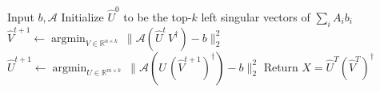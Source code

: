\documentclass[11pt]{article}
\theoremstyle{plain}
\theoremstyle{definition}
\newcommand{\R}{\mathbb{R}}
\DeclareMathOperator*{\argmin}{argmin}
\newcommand{\aff}{{\mathcal A}}
\newcommand{\as}{AltMinSense\ }
\begin{document}
\begin{algorithm}[th]
\caption{{\bf \as:} Alternating minimization for matrix sensing}
\label{algo:sensing-altmin}
\begin{algorithmic}[1]
\STATE Input $b,\aff$
\STATE Initialize $\widehat{U}^0$ to be the top-$k$ left singular vectors of $\sum_i A_i b_i$
	\STATE $\widehat{V}^{t+1}\leftarrow \argmin_{V\in \R^{n\times k}} \  \|\aff(\widehat{U}^t \,V^\dag )-b\|_2^2$
	\STATE $\widehat{U}^{t+1}\leftarrow \argmin_{U\in \mathbb{R}^{m\times k}} \  \|\aff(U\,(\widehat{V}^{t+1})^\dag )-b\|_2^2$
\ENDFOR
\STATE Return $X=\widehat{U}^T(\widehat{V}^T)^\dag $
\end{algorithmic}
\end{algorithm}

\end{document}
